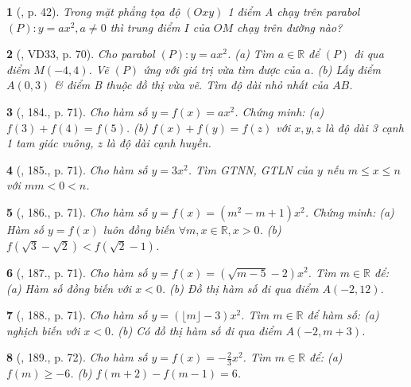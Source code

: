 \documentclass{article}
\newtheorem{baitoan}{}
\begin{document}
\begin{baitoan}[\cite{Binh_boi_duong_Toan_9_tap_2}, p. 42]
	Trong mặt phẳng tọa độ $(Oxy)$ 1 điểm A chạy trên parabol $(P):y = ax^2,a\ne0$ thì trung điểm $I$ của $OM$ chạy trên đường nào?
\end{baitoan}

\begin{baitoan}[\cite{Tuyen_Toan_9_old}, VD33, p. 70]
	Cho parabol $(P):y = ax^2$. (a) Tìm $a\in\mathbb{R}$ để $(P)$ đi qua điểm $M(-4,4)$. Vẽ $(P)$ ứng với giá trị vừa tìm được của $a$. (b) Lấy điểm $A(0,3)$ \& điểm B thuộc đồ thị vừa vẽ. Tìm độ dài nhỏ nhất của $AB$.
\end{baitoan}

\begin{baitoan}[\cite{Tuyen_Toan_9_old}, 184., p. 71]
	Cho hàm số $y = f(x) = ax^2$. Chứng minh: (a) $f(3) + f(4) = f(5)$. (b) $f(x) + f(y) = f(z)$ với $x,y,z$ là độ dài 3 cạnh 1 tam giác vuông, $z$ là độ dài cạnh huyền.
\end{baitoan}

\begin{baitoan}[\cite{Tuyen_Toan_9_old}, 185., p. 71]
	Cho hàm số $y = 3x^2$. Tìm {\rm GTNN, GTLN} của $y$ nếu $m\le x\le n$ với $mm < 0 < n$.
\end{baitoan}

\begin{baitoan}[\cite{Tuyen_Toan_9_old}, 186., p. 71]
	Cho hàm số $y = f(x) = (m^2 - m + 1)x^2$. Chứng minh: (a) Hàm số $y = f(x)$ luôn đồng biến $\forall m,x\in\mathbb{R},x > 0$. (b) $f(\sqrt{3} - \sqrt{2}) < f(\sqrt{2} - 1)$.
\end{baitoan}

\begin{baitoan}[\cite{Tuyen_Toan_9_old}, 187., p. 71]
	Cho hàm số $y = f(x) = (\sqrt{m - 5} - 2)x^2$. Tìm $m\in\mathbb{R}$ để: (a) Hàm số đồng biến với $x < 0$. (b) Đồ thị hàm số đi qua điểm $A(-2,12)$.
\end{baitoan}

\begin{baitoan}[\cite{Tuyen_Toan_9_old}, 188., p. 71]
	Cho hàm số $y = (\lfloor m\rfloor - 3)x^2$. Tìm $m\in\mathbb{R}$ để hàm số: (a) nghịch biến với $x < 0$. (b) Có đồ thị hàm số đi qua điểm $A(-2,m + 3)$.
\end{baitoan}

\begin{baitoan}[\cite{Tuyen_Toan_9_old}, 189., p. 72]
	Cho hàm số $y = f(x) = -\frac{2}{3}x^2$. Tìm $m\in\mathbb{R}$ để: (a) $f(m)\ge-6$. (b) $f(m + 2) - f(m - 1) = 6$.
\end{baitoan}
\end{document}
